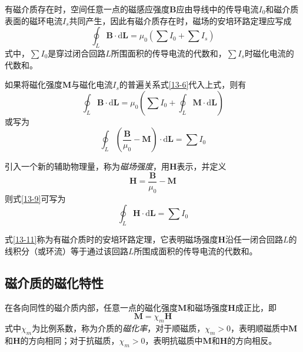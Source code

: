 \documentclass[12pt]{article}
\newcommand{\rmd}{\mathrm{d}}
\begin{document}
有磁介质存在时，空间任意一点的磁感应强度\(\boldsymbol{B}\)应由导线中的传导电流\(I_0\)和磁介质表面的磁环电流\(I_s\)共同产生，因此有磁介质存在时，磁场的安培环路定理应写成
\begin{equation}
    \oint_L \boldsymbol{B} \cdot \rmd \boldsymbol{L} = \mu_0 \left(\sum I_0 + \sum I_s\right)
\end{equation}
式中，\(\sum I_0\)是穿过闭合回路\(L\)所围面积的传导电流的代数和，\(\sum I_s\)时磁化电流的代数和。

如果将磁化强度\(\boldsymbol{M}\)与磁化电流\(I_s\)的普遍关系式\ref{13-6}代入上式，则有
\begin{equation}
    \oint_L \boldsymbol{B} \cdot \rmd \boldsymbol{L} = \mu_0 \left(\sum I_0 + \oint_L \boldsymbol{M} \cdot \rmd \boldsymbol{L}\right)
\end{equation}
或写为
\begin{equation}
    \oint_L \left(\frac{\boldsymbol{B}}{\mu_0} - \boldsymbol{M}\right) \cdot \rmd \boldsymbol{L} = \sum I_0
    \label{13-9}
\end{equation}

引入一个新的辅助物理量，称为\emph{磁场强度}，用\(\boldsymbol{H}\)表示，并定义
\begin{equation}
    \boldsymbol{H} = \frac{\boldsymbol{B}}{\mu_0} - \boldsymbol{M}
\end{equation}
则式\ref{13-9}可写为
\begin{equation}
    \oint_L \boldsymbol{H} \cdot \rmd \boldsymbol{L} = \sum I_0
    \label{13-11}
\end{equation}

式\ref{13-11}称为有磁介质时的安培环路定理，它表明磁场强度\(\boldsymbol{H}\)沿任一闭合回路\(L\)的线积分（或环流）等于通过该回路\(L\)所围成面积的传导电流的代数和。

\subsection{磁介质的磁化特性}

在各向同性的磁介质内部，任意一点的磁化强度\(\boldsymbol{M}\)和磁场强度\(\boldsymbol{H}\)成正比，即
\begin{equation}
    \boldsymbol{M} = \chi_m \boldsymbol{H}
\end{equation}
式中\(\chi_m\)为比例系数，称为介质的\emph{磁化率}，对于顺磁质，\(\chi_m > 0\)，表明顺磁质中\(\boldsymbol{M}\)和\(\boldsymbol{H}\)的方向相同；对于抗磁质，\(\chi_m > 0\)，表明抗磁质中\(\boldsymbol{M}\)和\(\boldsymbol{H}\)的方向相反。
\end{document}
